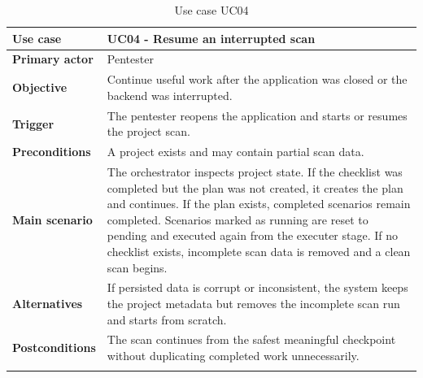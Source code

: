 \documentclass[12pt,a4paper]{report}
\begin{document}
\begin{longtable}{|p{}|p{}|}
\hline
\textbf{Use case} & UC04 - Resume an interrupted scan \\
\hline
\textbf{Primary actor} & Pentester \\
\hline
\textbf{Objective} & Continue useful work after the application was closed or the
backend was interrupted. \\
\hline
\textbf{Trigger} & The pentester reopens the application and starts or resumes the
project scan. \\
\hline
\textbf{Preconditions} & A project exists and may contain partial scan data. \\
\hline
\textbf{Main scenario} &
The orchestrator inspects project state. If the checklist was completed but the plan
was not created, it creates the plan and continues. If the plan exists, completed
scenarios remain completed. Scenarios marked as running are reset to pending and
executed again from the executer stage. If no checklist exists, incomplete scan data is
removed and a clean scan begins. \\
\hline
\textbf{Alternatives} & If persisted data is corrupt or inconsistent, the system keeps
the project metadata but removes the incomplete scan run and starts from scratch. \\
\hline
\textbf{Postconditions} & The scan continues from the safest meaningful checkpoint
without duplicating completed work unnecessarily. \\
\hline
\caption{Use case UC04}
\label{tab:uc04}
\end{longtable}
\end{document}
